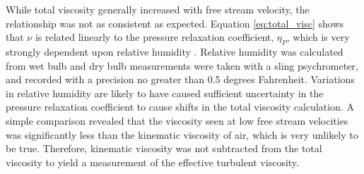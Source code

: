 While 
total viscosity generally increased with free stream velocity, the relationship 
was not as consistent as expected. Equation \ref{eq:total_visc} shows that 
$\nu$ is related linearly to the pressure relaxation coefficient, 
$\eta_P$, which is very strongly dependent upon relative humidity 
\cite{ash2011}. Relative humidity was calculated from wet bulb and dry bulb 
measurements were taken with a sling psychrometer, and recorded with a 
precision no greater than 0.5 degrees Fahrenheit. Variations in relative 
humidity are likely to have caused sufficient uncertainty in the pressure 
relaxation coefficient to cause shifts in the total viscosity calculation. A 
simple comparison revealed that the viscosity seen at low free stream 
velocities was significantly less than the kinematic viscosity of air, which is 
very unlikely to be true. Therefore, kinematic 
viscosity was not subtracted from the total viscosity to yield a measurement of 
the effective turbulent viscosity.
\pagebreak